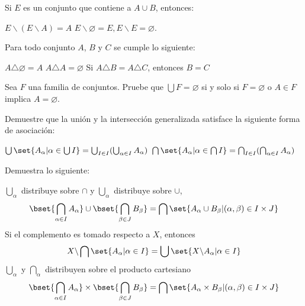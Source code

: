 \documentclass[fc]{tarea}
\newcommand{\menos}{\backslash}
\begin{document}
\begin{exercise}
    Si $E$ es un conjunto que contiene a $A \cup B$, entonces:
    \begin{tasks}
    \task $E \menos (E \menos A) = A$
    \task $E \menos \varnothing = E, E \menos E= \varnothing$.
    \end{tasks}
\end{exercise}

\begin{exercise}
    Para todo conjunto $A$, $B$ y $C$ se cumple lo siguiente:
    \begin{tasks}
    \task $A \triangle \varnothing = A$
    \task $A \triangle A = \varnothing$
    \task Si $A \triangle B = A \triangle C$, entonces $B = C$
    \end{tasks}
\end{exercise}

\begin{exercise}
    Sea $F$ una familia de conjuntos. Pruebe que $\bigcup F = \varnothing$ si y solo si $F = \varnothing$
    o $A \in F$ implica $A = \varnothing$.
\end{exercise}

\begin{exercise}
    Demuestre que la unión y la intersección generalizada satisface la siguiente forma de asociación:
    
     \begin{tasks}
     \task $\bigcup \set{ A_\alpha | \alpha \in \bigcup I} = \bigcup_{I \in I} (\bigcup_{\alpha \in I}A_\alpha)$
     \task $\bigcap \set{ A_\alpha | \alpha \in \bigcap I} = \bigcap_{I \in I} (\bigcap_{\alpha \in I}A_\alpha)$
     \end{tasks}
\end{exercise}

\begin{exercise}
    Demuestra lo siguiente:
    \begin{tasks}
        \task $\bigcup_\alpha$ distribuye sobre $\cap$ y $\bigcup_\alpha$ distribuye sobre $\cup$,
        $$\bset{\bigcap_{\alpha \in I} A_\alpha} \cup \bset{\bigcap_{\beta \in J} B_\beta} = \bigcap \set{A_\alpha \cup B_\beta | (\alpha,\beta) \in I\times J}$$
        \task Si el complemento es tomado respecto a $X$, entonces
        $$X\menos \bigcap \set{A_\alpha | \alpha \in I} = \bigcup \set{X\menos A_\alpha | \alpha \in I}$$
        \task $\bigcup_\alpha$ y $\bigcap_\alpha$ distribuyen sobre el producto cartesiano
        $$\bset{\bigcap_{\alpha \in I} A_\alpha} \times \bset{\bigcap_{\beta \in J} B_\beta} = \bigcap \set{A_\alpha \times B_\beta | (\alpha, \beta)\in I \times J}$$
    \end{tasks}
\end{exercise}
\end{document}
